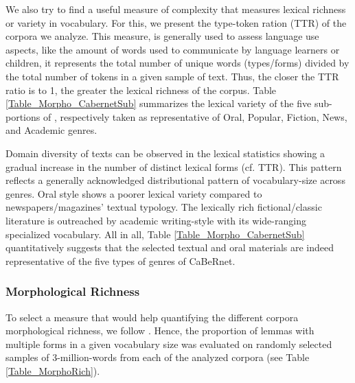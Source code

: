 We also try to find a useful measure of complexity that measures lexical richness or variety in vocabulary. For this, we present the type-token ration (TTR) of the corpora we analyze. This measure, is generally used to assess language use aspects, like the amount of words used to communicate by language learners or children, it represents the total number of unique words (types/forms) divided by the total number of tokens in a given sample of text. Thus, the closer the TTR ratio is to 1, the greater the lexical richness of the corpus. Table \ref{Table_Morpho_CabernetSub} summarizes the lexical variety of the five sub-portions of \Cabernet, respectively taken as representative of Oral, Popular, Fiction, News, and Academic genres.

Domain diversity of texts can be observed in the lexical statistics showing a gradual increase in the number of distinct lexical forms (cf. TTR). This pattern  reflects a generally acknowledged distributional pattern of vocabulary-size across genres. Oral style shows a poorer lexical variety compared to newspapers/magazines’ textual typology. The lexically rich fictional/classic literature is outreached by academic writing-style with its wide-ranging specialized vocabulary. All in all, Table \ref{Table_Morpho_CabernetSub} quantitatively suggests that the selected textual and oral materials are indeed representative of the five types of genres of CaBeRnet.

\subsubsection{Morphological Richness}

To select a measure that would help quantifying the different corpora morphological richness, we follow \citet{bonami-etal-2015-implicative}. Hence, the proportion of lemmas with multiple forms in a given vocabulary size was evaluated on randomly selected samples of 3-million-words from each of the analyzed corpora (see Table \ref{Table_MorphoRich}).

